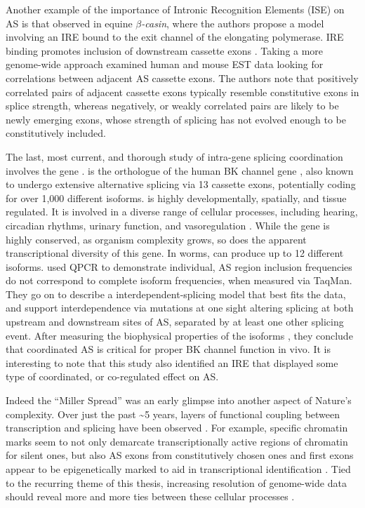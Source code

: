     Another example of the importance of Intronic Recognition Elements (ISE) on AS is that observed in equine \textit{$\beta$-casin}, where the authors propose a model involving an IRE bound to the exit channel of the elongating polymerase. IRE binding promotes inclusion of downstream cassette exons \citep{Lenasi2006}. Taking a more genome-wide approach \citet{Peng2008} examined human and mouse EST data looking for correlations between adjacent AS cassette exons. The authors note that positively correlated pairs of adjacent cassette exons typically resemble constitutive exons in splice strength, whereas negatively, or weakly correlated pairs are likely to be newly emerging exons, whose strength of splicing has not evolved enough to be constitutively included. 

    The last, most current, and thorough study of intra-gene splicing coordination involves the \worms{} gene \slo{} \citep{Glauser2011, Johnson2011}. \slo{} is the \worms{} orthologue of the human BK channel gene \kcnma{}, also known to undergo extensive alternative splicing \citep{Nilsen2010} via 13 cassette exons, potentially coding for over 1,000 different isoforms. \kcnma{} is highly developmentally, spatially, and tissue regulated. It is involved in a diverse range of cellular processes, including hearing, circadian rhythms, urinary function, and vasoregulation \citep{Fodor2009a}. While the gene is highly conserved, as organism complexity grows, so does the apparent transcriptional diversity of this gene. In worms, \slo{} can produce up to 12 different isoforms. \citet{Glauser2011} used QPCR to demonstrate individual, AS region inclusion frequencies do not correspond to complete isoform frequencies, when measured via TaqMan. They go on to describe a interdependent-splicing model that best fits the data, and support interdependence via mutations at one sight altering splicing at both upstream and downstream sites of AS, separated by at least one other splicing event. After measuring the biophysical properties of the isoforms \citep{Johnson2011}, they conclude that coordinated AS is critical for proper BK channel function in vivo. It is interesting to note that this study also identified an IRE that displayed some type of coordinated, or co-regulated effect on AS. 

    Indeed the ``Miller Spread'' was an early glimpse into another aspect of Nature's complexity. Over just the past \textasciitilde5 years, layers of functional coupling between transcription and splicing have been observed \citep{Merkhofer2014}. For example, specific chromatin marks seem to not only demarcate transcriptionally active regions of chromatin for silent ones, but also AS exons from constitutively chosen ones \citep{Kolasinska-Zwierz2009} and first exons appear to be epigenetically marked to aid in transcriptional identification \citep{Bieberstein2012}. Tied to the recurring theme of this thesis, increasing resolution of genome-wide data should reveal more and more ties between these cellular processes \citep{Schwartz2010,Luco2011a,Brown2012}.

